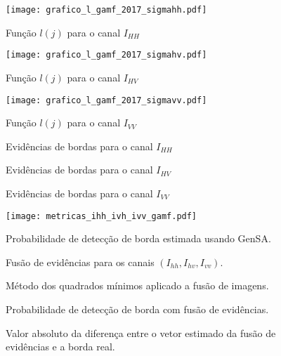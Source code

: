 \begin{figure}[hbt]
  \texttt{[image: grafico\_l\_gamf\_2017\_sigmahh.pdf]}
	\caption{Função $l(j)$ para o canal $I_{HH}$}\label{cap_acf_fig04}
\endminipage\hfill
{}
  \texttt{[image: grafico\_l\_gamf\_2017\_sigmahv.pdf]}
	\caption{Função $l(j)$ para o canal $I_{HV}$}\label{cap_acf_fig05}
\endminipage\hfill
\centering
{}
  \texttt{[image: grafico\_l\_gamf\_2017\_sigmavv.pdf]}
	\caption{Função $l(j)$ para o canal $I_{VV}$}\label{cap_acf_fig06}
\endminipage\hfill
\end{figure}
\begin{figure}[hbt]
\caption{Evidências de bordas para o canal $I_{HH}$}\label{cap_acf_fig07}
\endminipage\hfill
{}
\caption{Evidências de bordas para o canal $I_{HV}$}\label{cap_acf_fig08}
\endminipage\hfill
\centering
{}
\caption{Evidências de bordas para o canal $I_{VV}$}\label{cap_acf_fig09}
\endminipage\hfill
\end{figure}
%
\begin{figure}[hbt]
\centering
	\texttt{[image: metricas\_ihh\_ivh\_ivv\_gamf.pdf]}
	\caption{Probabilidade de detecção de borda estimada usando GenSA.}
\label{cap_acf_fig10}
\end{figure}
%
\begin{figure}[hbt]
	\caption{Fusão de evidências para os canais $\left(I_{hh}, I_{hv}, I_{vv}\right)$.}
\label{cap_acf_fig11}
\endminipage\hfill
{}
\caption{Método dos quadrados mínimos aplicado a fusão de imagens.}
\label{cap_acf_fig12}
\endminipage\hfill
\end{figure}
\begin{figure}[hbt]
	\caption{Probabilidade de detecção de borda com fusão de evidências.}
\label{cap_acf_fig13}
\endminipage\hfill
{}
	\caption{Valor absoluto da diferença entre o vetor estimado da fusão de evidências e a borda real.}
\label{cap_acf_fig14}
\endminipage\hfill
\end{figure}
